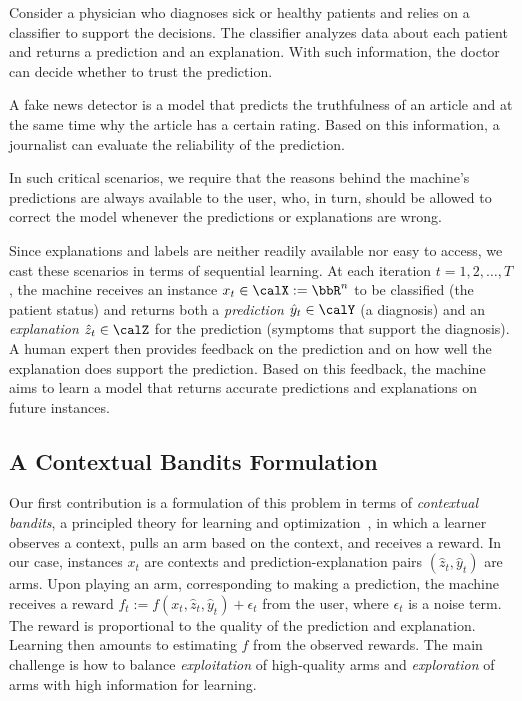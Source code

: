 \documentclass[letterpaper]{article} %
\begin{document}
\begin{example}
Consider a physician who diagnoses sick or healthy patients and relies on a classifier to support the decisions. The classifier analyzes data about each patient and returns a prediction and an explanation.  With such information, the doctor can decide whether to trust the prediction.
\end{example}

\begin{example}
A fake news detector is a model that predicts the truthfulness of an article and at the same time why the article has a certain rating.  Based on this information, a journalist can evaluate the reliability of the prediction.
\end{example}

\noindent
In such critical scenarios, we require that the reasons behind the machine's predictions are always available to the user, who, in turn, should be allowed to correct the model whenever the predictions or explanations are wrong.

Since explanations and labels are neither readily available nor easy to access, we cast these scenarios in terms of sequential learning.  At each iteration $t = 1, 2, \ldots, T$, the machine receives an instance $x_t \in \calX := \bbR^n$ to be classified (the patient status) and returns both a \emph{prediction} $\hat{y}_t \in \calY$ (a diagnosis) and an \emph{explanation} $\hat{z}_t \in \calZ$ for the prediction (symptoms that support the diagnosis).  A human expert then provides feedback on the prediction and on how well the explanation does support the prediction.  Based on this feedback, the machine aims to learn a model that returns accurate predictions and explanations on future instances.


\subsection{A Contextual Bandits Formulation}

Our first contribution is a formulation of this problem in terms of \emph{contextual bandits}, a principled theory  for learning and optimization~\cite{cesa2006prediction,bubeck2012regret}, in which a learner observes a context, pulls an arm based on the context, and receives a reward.
%
In our case, instances $x_t$ are contexts and prediction-explanation pairs $(\hat{z}_t, \hat{y}_t)$ are arms.  Upon playing an arm, corresponding to making a prediction, the machine receives a reward $f_t := f(x_t, \hat{z}_t, \hat{y}_t) + \epsilon_t$ from the user, where $\epsilon_t$ is a noise term.  The reward is proportional to the quality of the prediction and explanation.  Learning then amounts to estimating $f$ from the observed rewards.  The main challenge is how to balance \emph{exploitation} of high-quality arms and \emph{exploration} of arms with high information for learning.
\end{document}

